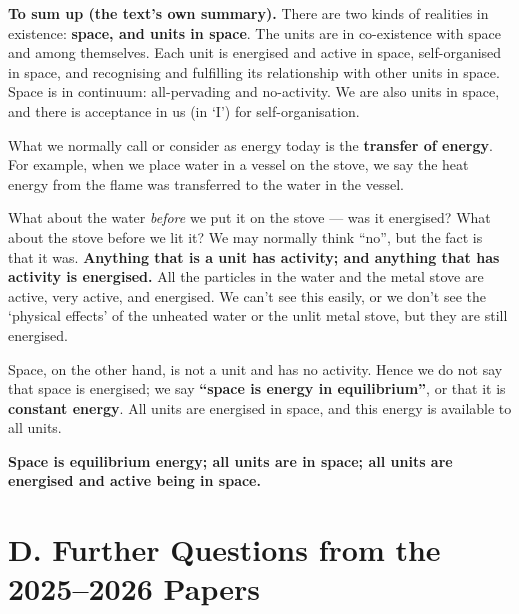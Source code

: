 \begin{keybox}
\textbf{\sffamily To sum up (the text's own summary).} There are two kinds of
realities in existence: \textbf{space, and units in space}. The units are in
co-existence with space and among themselves. Each unit is energised and
active in space, self-organised in space, and recognising and fulfilling its
relationship with other units in space. Space is in continuum: all-pervading
and no-activity. We are also units in space, and there is acceptance in us (in
`I') for self-organisation.
\end{keybox}


\ans What we normally call or consider as energy today is the \textbf{transfer
of energy}. For example, when we place water in a vessel on the stove, we say
the heat energy from the flame was transferred to the water in the vessel.

What about the water \emph{before} we put it on the stove --- was it
energised? What about the stove before we lit it? We may normally think ``no'',
but the fact is that it was. \textbf{Anything that is a unit has activity; and
anything that has activity is energised.} All the particles in the water and
the metal stove are active, very active, and energised. We can't see this
easily, or we don't see the `physical effects' of the unheated water or the
unlit metal stove, but they are still energised.

Space, on the other hand, is not a unit and has no activity. Hence we do not
say that space is energised; we say \textbf{``space is energy in
equilibrium''}, or that it is \textbf{constant energy}. All units are
energised in space, and this energy is available to all units.

\begin{keybox}
\textbf{Space is equilibrium energy; all units are in space; all units are
energised and active being in space.}
\end{keybox}

\section{D. Further Questions from the 2025--2026 Papers}


